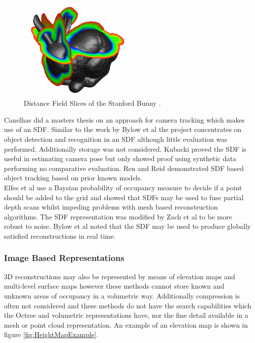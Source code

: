 \begin{figure}[!htb]
\centering
\includegraphics[width=6cm]{images/literature/SDFExample}
\caption{Distance Field Slices of the Stanford Bunny \cite{Sigg03Signed}.}
\label{fig:SDFExample}
\end{figure}

Canelhas \cite{Canelhas12Scene} did a masters thesis on an approach for camera tracking which makes use of an SDF. Similar to the work by Bylow et al \cite{Bylow13Real} the project concentrates on object detection and recognition in an SDF although little evaluation was performed. Additionally storage was not considered. Kubacki \cite{Kubacki12Registration} proved the SDF is useful in estimating camera pose but only showed proof using synthetic data performing no comparative evaluation. Ren and Reid \cite{Ren12Unified}  demonstrated SDF based object tracking based on prior known models. \\

Elfes et al \cite{Elfes87Sensor} use a Baysian probability of occupancy measure to decide if a point should be added to the grid and showed that SDFs may be used to fuse partial depth scans whilst impeding problems with mesh based reconstruction algorithms. The SDF representation was modified by Zach et al \cite{Zach07Globally} to be more robust to noise. Bylow et al noted that the SDF may be used to produce globally satisfied reconstructions in real time. \\


\subsubsection{Image Based Representations}

3D reconstructions may also be represented by means of elevation maps \cite{Herbert89Terrain} and multi-level surface maps \cite{Triebel06Multi} however these methods cannot store known and unknown areas of occupancy in a volumetric way. Additionally compression is often not considered and these methods do not have the search capabilities which the Octree and volumetric representations have, nor the fine detail available in a mesh or point cloud representation. An example of an elevation map is shown in figure \ref{fig:HeightMapExample}.\\


